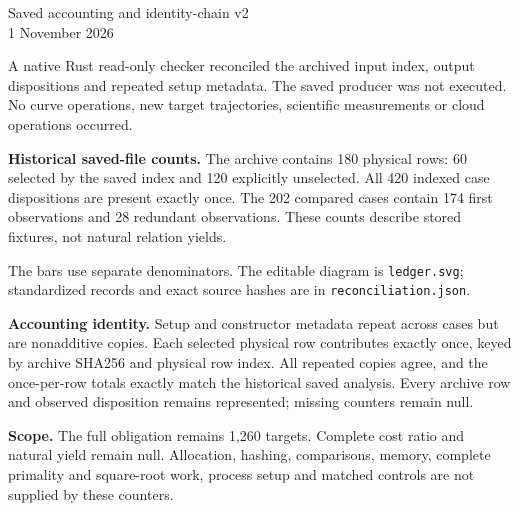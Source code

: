\documentclass[11pt]{article}
\begin{document}
\begin{center}{\Large Saved accounting and identity-chain v2}\\1 November 2026\end{center}
A native Rust read-only checker reconciled the archived input index, output dispositions and repeated setup metadata. The saved producer was not executed. No curve operations, new target trajectories, scientific measurements or cloud operations occurred.

\textbf{Historical saved-file counts.} The archive contains 180 physical rows: 60 selected by the saved index and 120 explicitly unselected. All 420 indexed case dispositions are present exactly once. The 202 compared cases contain 174 first observations and 28 redundant observations. These counts describe stored fixtures, not natural relation yields.

\begin{center}\end{center}
The bars use separate denominators. The editable diagram is \texttt{ledger.svg}; standardized records and exact source hashes are in \texttt{reconciliation.json}.

\textbf{Accounting identity.} Setup and constructor metadata repeat across cases but are nonadditive copies. Each selected physical row contributes exactly once, keyed by archive SHA256 and physical row index. All repeated copies agree, and the once-per-row totals exactly match the historical saved analysis. Every archive row and observed disposition remains represented; missing counters remain null.

\textbf{Scope.} The full obligation remains 1,260 targets. Complete cost ratio and natural yield remain null. Allocation, hashing, comparisons, memory, complete primality and square-root work, process setup and matched controls are not supplied by these counters.
\newpage
\end{document}
